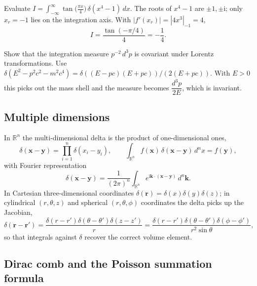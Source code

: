 \begin{example}
Evaluate $I=\displaystyle\int_{-\infty}^{\infty}\tan\!\bigl(\tfrac{\pi x}{4}\bigr)\,\delta(x^4-1)\,dx$.
The roots of $x^4-1$ are $\pm 1,\pm\mathrm{i}$; only $x_r=-1$ lies on the integration axis. With $|f'(x_r)|=|4x^3|_{-1}=4$,
\begin{equation}
I=\frac{\tan(-\pi/4)}{4}=-\frac{1}{4}.
\end{equation}
\end{example}

\begin{example}
Show that the integration measure $p^{-2}\,d^3 p$ is covariant under Lorentz transformations. Use $\delta(E^2-p^2c^2-m^2c^4)=\delta((E-pc)(E+pc))/(2(E+pc))$. With $E>0$ this picks out the mass shell and the measure becomes $\dfrac{d^3 p}{2E}$, which is invariant.
\end{example}

\subsection{Multiple dimensions}

In $\mathbb{R}^n$ the multi-dimensional delta is the product of one-dimensional ones,
\begin{equation}
\delta(\mathbf{x}-\mathbf{y})=\prod_{i=1}^n\delta(x_i-y_i),
\qquad
\int_{\mathbb{R}^n}f(\mathbf{x})\,\delta(\mathbf{x}-\mathbf{y})\,d^n x=f(\mathbf{y}),
\end{equation}
with Fourier representation
\begin{equation}
\delta(\mathbf{x}-\mathbf{y})=\frac{1}{(2\pi)^n}\int_{\mathbb{R}^n}e^{\mathrm{i}\mathbf{k}\cdot(\mathbf{x}-\mathbf{y})}\,d^n\mathbf{k}.
\end{equation}
In Cartesian three-dimensional coordinates $\delta(\mathbf{r})=\delta(x)\delta(y)\delta(z)$; in cylindrical $(r,\theta,z)$ and spherical $(r,\theta,\phi)$ coordinates the delta picks up the Jacobian,
\begin{equation}
\delta(\mathbf{r}-\mathbf{r}')=\frac{\delta(r-r')\delta(\theta-\theta')\delta(z-z')}{r}
=\frac{\delta(r-r')\delta(\theta-\theta')\delta(\phi-\phi')}{r^2\sin\theta},
\end{equation}
so that integrals against $\delta$ recover the correct volume element.

\subsection{Dirac comb and the Poisson summation formula}

